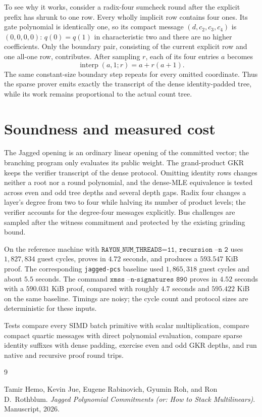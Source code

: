 \documentclass[11pt]{article}
\begin{document}
To see why it works, consider a radix-four sumcheck round after the explicit prefix has shrunk to one row. Every wholly implicit row contains four ones. Its gate polynomial is identically one, so its compact message $(d,c_2,c_3,c_4)$ is $(0,0,0,0)$: $q(0)=q(1)$ in characteristic two and there are no higher coefficients. Only the boundary pair, consisting of the current explicit row and one all-one row, contributes. After sampling $r$, each of its four entries $a$ becomes
\[
\operatorname{interp}(a,1;r)=a+r(a+1).
\]
The same constant-size boundary step repeats for every omitted coordinate. Thus the sparse prover emits exactly the transcript of the dense identity-padded tree, while its work remains proportional to the actual count tree.

\section{Soundness and measured cost}

The Jagged opening is an ordinary linear opening of the committed vector; the branching program only evaluates its public weight. The grand-product GKR keeps the verifier transcript of the dense protocol. Omitting identity rows changes neither a root nor a round polynomial, and the dense-MLE equivalence is tested across even and odd tree depths and several depth gaps. Radix four changes a layer's degree from two to four while halving its number of product levels; the verifier accounts for the degree-four messages explicitly. Bus challenges are sampled after the witness commitment and protected by the existing grinding bound.

On the reference machine with $\texttt{RAYON\_NUM\_THREADS=11}$, $\texttt{recursion --n 2}$ uses $1{,}827{,}834$ guest cycles, proves in $4.72$ seconds, and produces a $593.547$ KiB proof. The corresponding \texttt{jagged-pcs} baseline used $1{,}865{,}318$ guest cycles and about $5.5$ seconds. The command $\texttt{xmss --n-signatures 890}$ proves in $4.52$ seconds with a $590.031$ KiB proof, compared with roughly $4.7$ seconds and $595.422$ KiB on the same baseline. Timings are noisy; the cycle count and protocol sizes are deterministic for these inputs.

Tests compare every SIMD batch primitive with scalar multiplication, compare compact quartic messages with direct polynomial evaluation, compare sparse identity suffixes with dense padding, exercise even and odd GKR depths, and run native and recursive proof round trips.

\begin{thebibliography}{9}

Tamir Hemo, Kevin Jue, Eugene Rabinovich, Gyumin Roh, and Ron D.\ Rothblum.
\newblock \emph{Jagged Polynomial Commitments (or: How to Stack Multilinears)}.
\newblock Manuscript, 2026.

\end{thebibliography}
\end{document}
